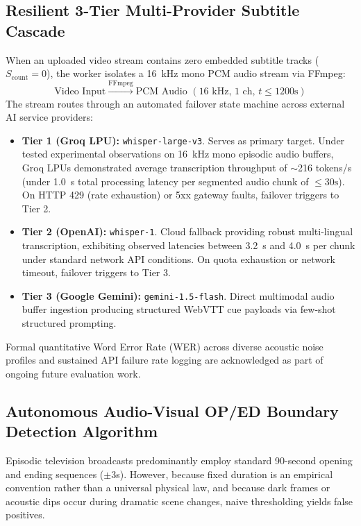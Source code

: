 \documentclass[conference]{IEEEtran}
\begin{document}
\subsection{Resilient 3-Tier Multi-Provider Subtitle Cascade}
When an uploaded video stream contains zero embedded subtitle tracks ($S_{\text{count}} = 0$), the worker isolates a 16~kHz mono PCM audio stream via FFmpeg:
\begin{equation}
\text{Video Input} \xrightarrow{\text{FFmpeg}} \text{PCM Audio } (16\text{ kHz}, \, 1\text{ ch}, \, t \le 1200\text{s})
\end{equation}
The stream routes through an automated failover state machine across external AI service providers:
\begin{itemize}
    \item \textbf{Tier 1 (Groq LPU):} \texttt{whisper-large-v3}. Serves as primary target. Under tested experimental observations on 16~kHz mono episodic audio buffers, Groq LPUs demonstrated average transcription throughput of $\sim$216 tokens/s (under 1.0~s total processing latency per segmented audio chunk of $\le 30\text{s}$). On HTTP 429 (rate exhaustion) or 5xx gateway faults, failover triggers to Tier 2.
    \item \textbf{Tier 2 (OpenAI):} \texttt{whisper-1}. Cloud fallback providing robust multi-lingual transcription, exhibiting observed latencies between 3.2~s and 4.0~s per chunk under standard network API conditions. On quota exhaustion or network timeout, failover triggers to Tier 3.
    \item \textbf{Tier 3 (Google Gemini):} \texttt{gemini-1.5-flash}. Direct multimodal audio buffer ingestion producing structured WebVTT cue payloads via few-shot structured prompting.
\end{itemize}
Formal quantitative Word Error Rate (WER) across diverse acoustic noise profiles and sustained API failure rate logging are acknowledged as part of ongoing future evaluation work.

\subsection{Autonomous Audio-Visual OP/ED Boundary Detection Algorithm}
Episodic television broadcasts predominantly employ standard 90-second opening and ending sequences ($\pm 3$s). However, because fixed duration is an empirical convention rather than a universal physical law, and because dark frames or acoustic dips occur during dramatic scene changes, naive thresholding yields false positives.
\end{document}
